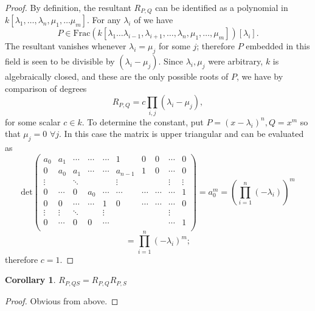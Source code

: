 \documentclass{article}
\newtheorem*{corollary*}{Corollary}
\theoremstyle{remark}
\begin{document}
\begin{proof}
By definition, the resultant $R_{P,Q}$ can be identified as a polynomial in $k[\lambda_1,\ldots, \lambda_n, \mu_1,\ldots \mu_m]$. For any $\lambda_i$ of we have
\[P\in \text{Frac}(k[\lambda_1\ldots \lambda_{i-1},\lambda_{i+1},\ldots,\lambda_n,\mu_1,\ldots,\mu_m])[\lambda_i].\]
The resultant vanishes whenever $\lambda_i=\mu_j$ for some $j$; therefore $P$ embedded in this field is seen to be divisible by $(\lambda_i - \mu_j)$. Since $\lambda_i,\mu_j$ were arbitrary, $k$ is algebraically closed, and these are the only possible roots of $P$, we have by comparison of degrees 
\[R_{P,Q}=c\prod_{i,j}(\lambda_i - \mu_j),\]
for some scalar $c\in k$. To determine the constant, put $P=(x-\lambda_i)^n,Q=x^m$ so that $\mu_j=0$ $\forall j$. In this case the matrix is upper triangular and can be evaluated as
\[\text{det} \begin{pmatrix}
  a_0   &    a_1 & \cdots & \cdots & \cdots &    1    & 0       & 0           & \cdots & 0         \\
       0     &  a_0       &  a_1        & \cdots & \cdots &      a_{n-1}     &    1      & 0         & \cdots  & 0          \\
  \vdots  &         & \ddots &           &            & \vdots   &           & \           & \vdots & \vdots  \\
  0         &  \cdots &       0    &  a_0  & \cdots &\cdots    &\cdots  &\cdots &\cdots   &      1     \\
  0         &      0     & \cdots & \cdots &    1     & 0           & \cdots & \cdots & \cdots & 0         \\
   \vdots  & \vdots & \ddots &         & \vdots   &              &          &             & \vdots               \\
   0         &  \cdots  &     0    &    0   & \cdots &             &           &           &\cdots   & 1          \\
 \end{pmatrix}
 =a_0^m=(\prod_{i=1}^{n}( -\lambda_i))^m\]
 \[=\prod_{i=1}^{n}( -\lambda_i)^m;\]
 therefore $c=1$.

\end{proof}
\begin{corollary*}
$R_{P,QS}=R_{P,Q} R_{P,S}$
\end{corollary*}
\begin{proof}
Obvious from above.
\end{proof}
\end{document}
